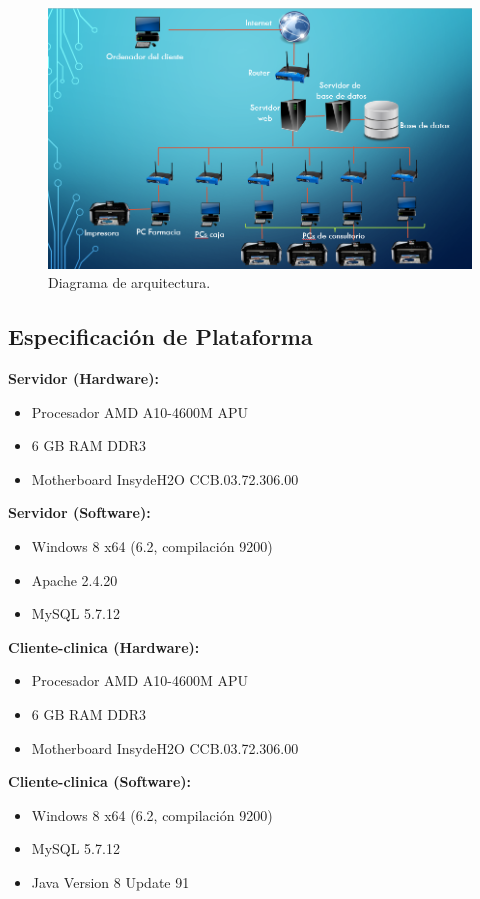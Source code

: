 	\begin{figure}[htbp!]
		\centering
			\includegraphics[width=1.15\textwidth]{images/arquitectura1.png}
		\caption{Diagrama de arquitectura.}
	\end{figure}



\subsection{Especificación de Plataforma}

\bfseries Servidor (Hardware): \mdseries
\begin{itemize}
\item Procesador AMD A10-4600M APU
\item 6 GB RAM DDR3
\item Motherboard InsydeH2O CCB.03.72.306.00
\end{itemize}

\bfseries Servidor (Software): \mdseries
\begin{itemize}
\item Windows 8 x64 (6.2, compilaci\'on 9200)
\item Apache 2.4.20
\item MySQL 5.7.12
\end{itemize}

\bfseries Cliente-clinica (Hardware): \mdseries
\begin{itemize}
\item Procesador AMD A10-4600M APU
\item 6 GB RAM DDR3
\item Motherboard InsydeH2O CCB.03.72.306.00
\end{itemize}

\bfseries Cliente-clinica (Software): \mdseries
\begin{itemize}
\item Windows 8 x64 (6.2, compilaci\'on 9200)
\item MySQL 5.7.12
\item Java Version 8 Update 91
\end{itemize}

